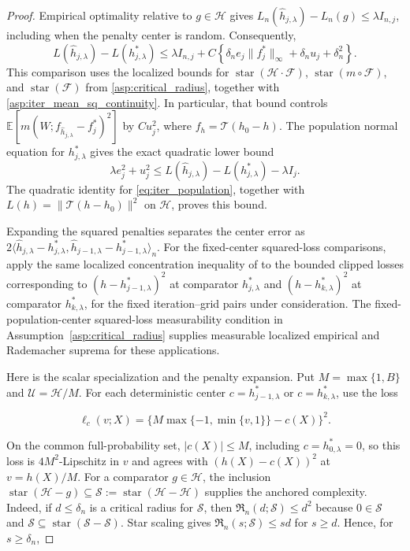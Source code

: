 \begin{proof}
Empirical optimality relative to $g\in\mathcal H$ gives $L_n(\hat h_{j,\lambda})-L_n(g)\leqslant\lambda I_{n,j}$, including when the penalty center is random. Consequently,
\begin{equation}\label{eq:iter_trae_biasless}
L(\hat h_{j,\lambda})-L(h_{j,\lambda}^*)
\leqslant \lambda I_{n,j}
+C\left\{
\delta_ne_j\|f_j^*\|_\infty
+\delta_nu_j+\delta_n^2
\right\}.
\end{equation}
This comparison uses the localized bounds for
$\operatorname{star}(\mathcal H\cdotp\mathcal F)$,
$\operatorname{star}(m\circ\mathcal F)$, and
$\operatorname{star}(\mathcal F)$ from \cref{asp:critical_radius}, together
with \cref{asp:iter_mean_sq_continuity}. In
particular, that bound controls
$\mathbb E[m(W;f_{\hat h_{j,\lambda}}-f_j^*)^2]$ by $Cu_j^2$,
where $f_h=\mathcal T(h_0-h)$.
The population normal equation for $h_{j,\lambda}^*$ gives the exact quadratic lower bound
\begin{equation}\label{eq:iter_trae_population_curvature}
\lambda e_j^2+u_j^2 \leqslant L(\hat h_{j,\lambda})-L(h_{j,\lambda}^*)-\lambda I_j.
\end{equation}
The quadratic identity for \eqref{eq:iter_population}, together with
$L(h)=\|\mathcal T(h-h_0)\|^2$ on $\mathcal H$, proves this bound.

Expanding the squared penalties separates the center error as
$2\langle\hat h_{j,\lambda}-h_{j,\lambda}^*,
\hat h_{j-1,\lambda}-h_{j-1,\lambda}^*\rangle_n$.
For the fixed-center squared-loss comparisons, apply the same localized concentration inequality of \citet[Lemma~9]{bennett2023source} to the bounded clipped losses corresponding to $(h-h_{j-1,\lambda}^*)^2$ at comparator $h_{j,\lambda}^*$ and $(h-h_{k,\lambda}^*)^2$ at comparator $h_{k,\lambda}^*$, for the fixed iteration--grid pairs under consideration. The fixed-population-center squared-loss measurability condition in Assumption~\ref{asp:critical_radius} supplies measurable localized empirical and Rademacher suprema for these applications. 

Here is the scalar specialization and the penalty expansion. Put $M=\max\{1,B\}$ and $\mathcal U=\mathcal H/M$. For each deterministic center $c=h_{j-1,\lambda}^*$ or $c=h_{k,\lambda}^*$, use the loss

\[
\ell_c(v;X)=\{M\max\{-1,\min\{v,1\}\}-c(X)\}^2.
\]

On the common full-probability set, $|c(X)|\leqslant M$, including $c=h_{0,\lambda}^*=0$, so this loss is $4M^2$-Lipschitz in $v$ and agrees with $(h(X)-c(X))^2$ at $v=h(X)/M$.
For a comparator $g\in\mathcal H$, the inclusion $\operatorname{star}(\mathcal H-g)\subseteq\mathcal S:=\operatorname{star}(\mathcal H-\mathcal H)$ supplies the anchored complexity. Indeed, if $d\leqslant\delta_n$ is a critical radius for $\mathcal S$, then $\mathfrak R_n(d;\mathcal S)\leqslant d^2$ because $0\in\mathcal S$ and $\mathcal S\subseteq\operatorname{star}(\mathcal S-\mathcal S)$. Star scaling gives $\mathfrak R_n(s;\mathcal S)\leqslant sd$ for $s\geqslant d$. Hence, for $s\geqslant\delta_n$,


\end{proof}
